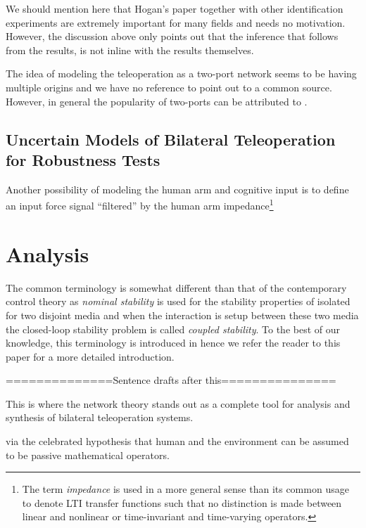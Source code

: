 We should mention here that Hogan's paper together with other identification experiments are extremely important for many
fields and needs no motivation. However, the discussion above only points out that the inference that follows from the results, 
is not inline with the results themselves. 

The idea of modeling the teleoperation as a two-port network seems to be having multiple origins and we have no reference to 
point out to a common source. However, in general the popularity of two-ports can be attributed to \cite{andersonspong,nieslotine,rajuphd,hannaford89,
yokokohjiyoshikawa}. 

\subsection{Uncertain Models of Bilateral Teleoperation for Robustness Tests}

Another possibility of modeling the human arm and cognitive input is to define an input force signal ``filtered'' by the 
human arm impedance\footnote{The term \emph{impedance} is used in a more general sense than its common usage to denote
LTI transfer functions such that no distinction is made between linear and nonlinear or time-invariant and time-varying 
operators.} 







\section{Analysis}\label{sec:litchapanalysis}

The common terminology
is somewhat different than that of the contemporary control theory as \emph{nominal stability} is used for the stability 
properties of isolated for two disjoint media and when the interaction is setup between these two media the closed-loop 
stability problem is called \emph{coupled stability}. To the best of our knowledge, this terminology is introduced in 
\cite{colgatehogan88} hence we refer the reader to this paper for a more detailed introduction. 

==============Sentence drafts after this===============

This is where the network theory stands out as a complete tool for 
analysis and synthesis of bilateral teleoperation systems. 


via the celebrated hypothesis that human and the environment can be assumed 
to be passive mathematical operators.







